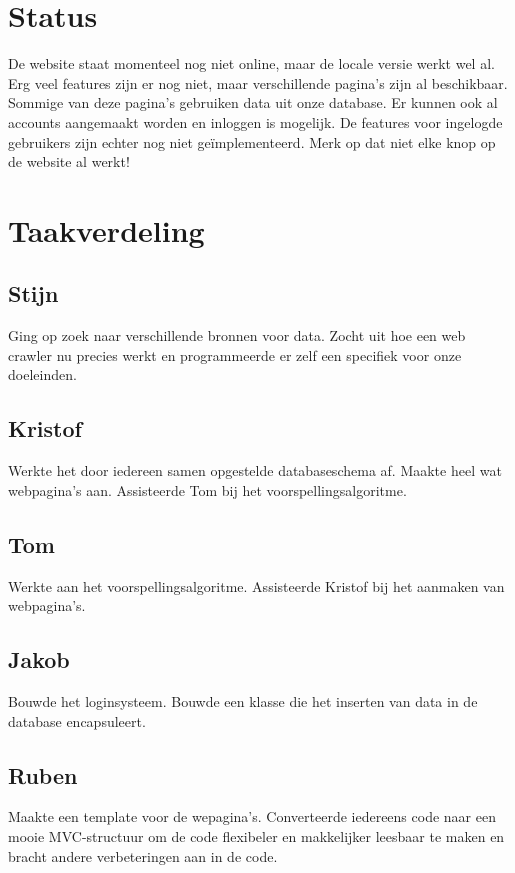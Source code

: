 \documentclass[11pt, a4paper]{article}
\begin{document}
\title{}
\author{Groep A\\ Rapport 1}
\date{19 maart 2014}
\maketitle


\section{Status}
De website staat momenteel nog niet online, maar de locale versie werkt wel al.	Erg veel features zijn er nog niet, maar verschillende pagina's zijn al beschikbaar. Sommige van deze pagina's gebruiken data uit onze database. Er kunnen ook al accounts aangemaakt worden en inloggen is mogelijk. De features voor ingelogde gebruikers zijn echter nog niet ge\"implementeerd. Merk op dat niet elke knop op de website al werkt!

\section{Taakverdeling}
\subsection{Stijn}
Ging op zoek naar verschillende bronnen voor data. Zocht uit hoe een web crawler nu precies werkt en programmeerde er zelf een specifiek voor onze doeleinden.
\subsection{Kristof}
Werkte het door iedereen samen opgestelde databaseschema af. Maakte heel wat webpagina's aan. Assisteerde Tom bij het voorspellingsalgoritme.
\subsection{Tom}
Werkte aan het voorspellingsalgoritme. Assisteerde Kristof bij het aanmaken van webpagina's.
\subsection{Jakob}
Bouwde het loginsysteem. Bouwde een klasse die het inserten van data in de database encapsuleert.
\subsection{Ruben}
Maakte een template voor de wepagina's. Converteerde iedereens code naar een mooie MVC-structuur om de code flexibeler en makkelijker leesbaar te maken en bracht andere verbeteringen aan in de code.
\end{document}
